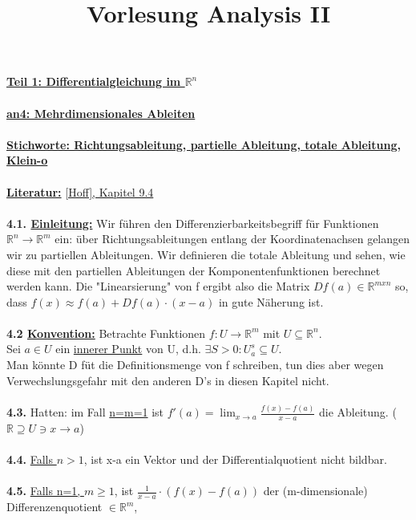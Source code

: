 \documentclass[]{scrartcl}
\title{Vorlesung Analysis II}
\begin{document}
	\maketitle
	\textbf{\underline{Teil 1: Differentialgleichung im $\mathbb{R}^n$}}\\
	\\
	\textbf{\underline{an4: Mehrdimensionales Ableiten}}\\
	\\
	\textbf{\underline{\underline{Stichworte:} Richtungsableitung, partielle Ableitung, totale Ableitung, Klein-o}}\\
	\\
	\textbf{\underline{Literatur:}} \ul{[Hoff], Kapitel 9.4}\\
	\\
	\textbf{4.1. \underline{Einleitung:}} Wir führen den 
	Differenzierbarkeitsbegriff  für Funktionen 
	$\mathbb{R}^n\rightarrow\mathbb{R}^m$ ein: über Richtungsableitungen 
	entlang 
	der Koordinatenachsen gelangen wir zu partiellen Ableitungen. Wir 
	definieren die totale Ableitung und sehen, wie diese mit den partiellen 
	Ableitungen der Komponentenfunktionen berechnet werden kann. Die 
	"Linearsierung" von f ergibt also die Matrix $Df(a)\in\mathbb{R}^{m x n}$ 
	so, dass $f(x) \approx f(a)+Df(a)\cdot(x-a)$ in gute Näherung ist.\\
	\\
	\textbf{4.2 \underline{Konvention:}} Betrachte Funktionen $f:U\rightarrow\mathbb{R}^m$ mit $U \subseteq \mathbb{R}^n$.\\
	Sei $a \in U$ ein \ul{innerer Punkt} von U, d.h. $\exists S 
	> 0: U_a^s\subseteq U.$\\
	Man könnte D füt die Definitionsmenge von f schreiben, tun dies aber wegen Verwechslungsgefahr mit den anderen D's in diesen Kapitel nicht.\\
	\\
	\textbf{4.3.} Hatten: im Fall \underline{n=m=1} ist $f'(a)=\lim_{x\rightarrow a}\frac{f(x)-f(a)}{x-a}$ die Ableitung.  ($\mathbb{R}\supseteq U \ni x \rightarrow a$)\\
	\\
	\textbf{4.4.} \underline{Falls $n>1$}, ist x-a ein Vektor und der Differentialquotient nicht bildbar.\\
	\\
	\textbf{4.5.} \underline{Falls n=1, $m\geq 1$}, ist $\frac{1}{x-a} \cdot 
	(f(x)-f(a))$ der (m-dimensionale) Differenzenquotient \underline{$\in 
	\mathbb{R}^m$},\\
\end{document}
